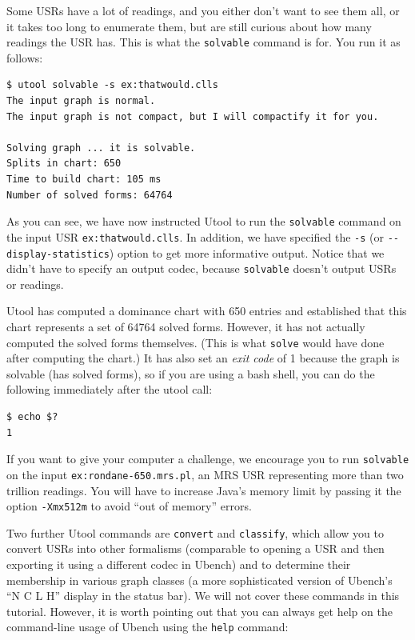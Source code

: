 Some USRs have a lot of readings, and you either don't want to see them all, or it takes too long to enumerate them, but are still curious about how many readings the USR has. This is what the \verb?solvable? command is for. You run it as follows:

\begin{verbatim}
$ utool solvable -s ex:thatwould.clls
The input graph is normal.
The input graph is not compact, but I will compactify it for you.

Solving graph ... it is solvable.
Splits in chart: 650
Time to build chart: 105 ms
Number of solved forms: 64764
\end{verbatim}

As you can see, we have now instructed Utool to run the \verb?solvable? command on the input USR \verb?ex:thatwould.clls?. In addition, we have specified the \verb?-s? (or \verb?--display-statistics?) option to get more informative output. Notice that we didn't have to specify an output codec, because \verb?solvable? doesn't output USRs or readings.

Utool has computed a dominance chart with 650 entries and established that this chart represents a set of 64764 solved forms. However, it has not actually computed the solved forms themselves. (This is what \verb?solve? would have done after computing the chart.) It has also set an \emph{exit code} of 1 because the graph is solvable (has solved forms), so if you are using a bash shell, you can do the following immediately after the utool call:

\begin{verbatim}
$ echo $?
1
\end{verbatim}

If you want to give your computer a challenge, we encourage you to run \verb?solvable? on the input \verb?ex:rondane-650.mrs.pl?, an MRS USR representing more than two trillion readings. You will have to increase Java's memory limit by passing it the option \verb?-Xmx512m? to avoid ``out of memory'' errors.


Two further Utool commands are \verb?convert? and \verb?classify?, which allow you to convert USRs into other formalisms (comparable to opening a USR and then exporting it using a different codec in Ubench) and to determine their membership in various graph classes (a more sophisticated version of Ubench's ``N C L H'' display in the status bar). We will not cover these commands in this tutorial. However, it is worth pointing out that you can always get help on the command-line usage of Ubench using the \verb?help? command:

